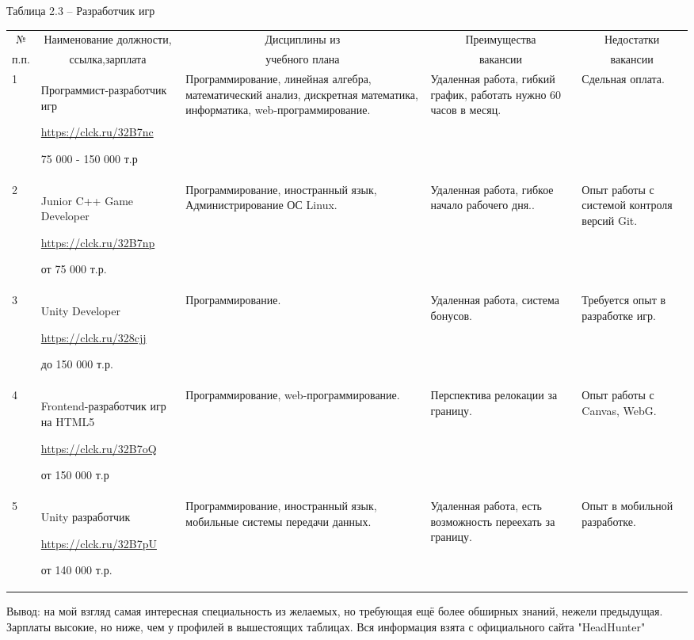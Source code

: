 \begin{landscape}
Таблица 2.3 – Разработчик игр
\begin{table}[H]
	\begin{center}
		\begin{small}
		\begin{tabular}{|p{1.1cm}|p{6cm}|p{5.2cm}|p{4cm}|p{4cm}|} \hline
			\multicolumn{1}{|c|}{№}&\multicolumn{1}{c|}{Наименование должности,}&\multicolumn{1}{c|}{Дисциплины из}&\multicolumn{1}{c|}{Преимущества }&\multicolumn{1}{c|}{Недостатки}\\ 
			\multicolumn{1}{|c|}{п.п.}&\multicolumn{1}{c|}{ссылка,зарплата}&\multicolumn{1}{c|}{учебного плана}&\multicolumn{1}{c|}{ вакансии}&\multicolumn{1}{c|}{вакансии}\\ 
			\hline
			1 & Программист-разработчик игр
			
			\url{https://clck.ru/32B7nc}
			
			75 000 - 150 000 т.р & Программирование, линейная алгебра, математический анализ, дискретная математика, информатика, web-программирование.& Удаленная работа, гибкий график, работать нужно 60 часов в месяц.& Сдельная оплата.\\
			\hline
			2 & Junior C++ Game Developer
			
			\url{https://clck.ru/32B7np}
			
			от 75 000 т.р. & Программирование, иностранный язык, Администрирование ОС Linux.& Удаленная работа, гибкое начало рабочего дня..& Опыт работы с системой контроля версий Git.\\
			\hline
                3 & Unity Developer
			
			\url{https://clck.ru/328cjj}
			
			до 150 000 т.р. & Программирование.& Удаленная работа, система бонусов.& Требуется опыт в разработке игр.\\
			\hline
			4 & Frontend-разработчик игр на HTML5
			
			\url{https://clck.ru/32B7oQ}
			
			от 150 000 т.р & Программирование, web-программирование.& Перспектива релокации за границу.& Опыт работы с Canvas, WebG.\\
			\hline
			5 & Unity разработчик
			
			\url{https://clck.ru/32B7pU}
			
			от 140 000 т.р. & Программирование, иностранный язык, мобильные системы передачи данных.& Удаленная работа, есть возможность переехать за границу.& Опыт в мобильной разработке.\\
			\hline
		\end{tabular}
	\end{small}
	\end{center}
\end{table}
Вывод: на мой взгляд самая интересная специальность из желаемых, но требующая ещё более обширных знаний, нежели предыдущая. Зарплаты высокие, но ниже, чем у профилей в вышестоящих таблицах.
\newline
\indent
Вся информация взята с официального сайта "HeadHunter" \cite{headhunter}
\end{landscape}


